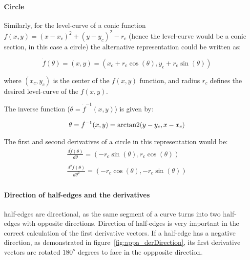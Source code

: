 \paragraph{Circle}
Similarly, for the level-curve of a conic function $f(x,y)=(x-x_c)^2+(y-y_c)^2-r_c$ (hence the level-curve would be a conic section, in this case a circle) the alternative representation could be written as:

\[
\dot{f}(\theta) = (x,y) = \left( x_c + r_c \cos(\theta), y_c + r_c \sin(\theta) \right)
\]

where $(x_c,y_c)$ is the center of the $f(x,y)$ function, and radius $r_c$ defines the desired level-curve of the $f(x,y)$.\bigskip

The inverse function ($\theta = \dot{f}^{-1}(x,y)$) is given by:

\[
\theta = \dot{f}^{-1}(x,y) = \operatorname{arctan2} (y - y_c, x - x_c)
\]

The first and second derivatives of a circle in this representation would be:
\[
\begin{array}{l}
  \frac{d\dot{f}(\theta)}{d\theta} = \left( -r_c \sin(\theta), r_c \cos(\theta) \right)\\
  \quad\\
  \frac{d^2\dot{f}(\theta)}{d\theta^2} = \left( -r_c \cos(\theta), -r_c \sin(\theta) \right)\\
\end{array}
\]

\paragraph{Direction of half-edges and the derivatives}
half-edges are directional, as the same segment of a curve turns into two half-edges with opposite directions.
Direction of half-edges is very important in the correct calculation of the first derivative vectors.
If a half-edge has a negative direction, as demonstrated in figure~\ref{fig:appa_derDirection}, its first derivative vectors are rotated $180^o$ degrees to face in the oppposite direction.

